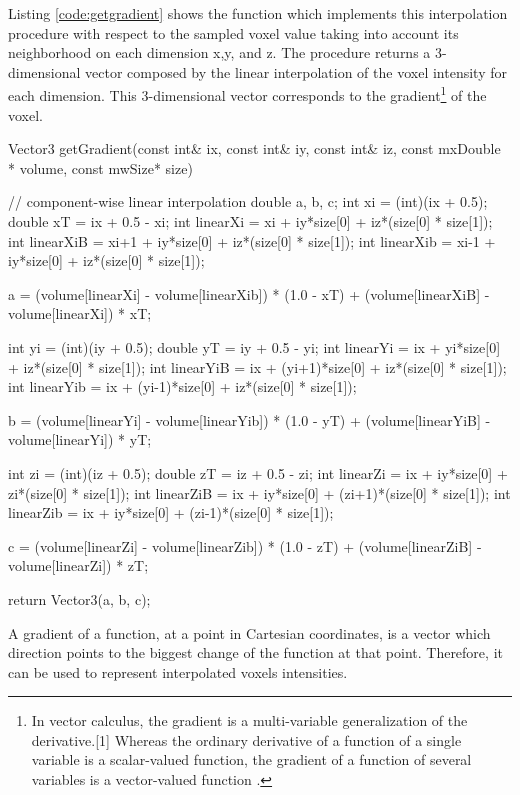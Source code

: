 \documentclass[12pt,a4paper]{extarticle}
\newcommand{\linespace}{\vspace{0pt}}
\begin{document}
Listing \ref{code:getgradient} shows the function which implements this interpolation procedure with respect to the sampled voxel value taking into account its neighborhood on each dimension x,y, and z. The procedure returns a 3-dimensional vector composed by the linear interpolation of the voxel intensity for each dimension. This 3-dimensional vector corresponds to the gradient\footnote{In vector calculus, the gradient is a multi-variable generalization of the derivative.[1] Whereas the ordinary derivative of a function of a single variable is a scalar-valued function, the gradient of a function of several variables is a vector-valued function \cite{gradient:7}.} of the voxel. 

\begin{cpp}[caption={Component-wise linear interpolation functions computing voxel gradient},label=code:getgradient]
Vector3 getGradient(const int& ix, const int& iy, const int& iz, 
		const mxDouble * volume, const mwSize* size) {
	// component-wise linear interpolation
	double a, b, c;
	int xi = (int)(ix + 0.5);
	double xT = ix + 0.5 - xi;
	int linearXi = xi + iy*size[0] + iz*(size[0] * size[1]);
	int linearXiB = xi+1 + iy*size[0] + iz*(size[0] * size[1]);
	int linearXib = xi-1 + iy*size[0] + iz*(size[0] * size[1]);

	a = (volume[linearXi] - volume[linearXib]) * (1.0 - xT) + 
	(volume[linearXiB] - volume[linearXi]) * xT;
	
	int yi = (int)(iy + 0.5);
	double yT = iy + 0.5 - yi;
	int linearYi = ix + yi*size[0] + iz*(size[0] * size[1]);
	int linearYiB = ix + (yi+1)*size[0] + iz*(size[0] * size[1]);
	int linearYib = ix + (yi-1)*size[0] + iz*(size[0] * size[1]);
	
	b = (volume[linearYi] - volume[linearYib]) * (1.0 - yT) + 
	(volume[linearYiB] - volume[linearYi]) * yT;
	
	int zi = (int)(iz + 0.5);
	double zT = iz + 0.5 - zi;
	int linearZi = ix + iy*size[0] + zi*(size[0] * size[1]);
	int linearZiB = ix + iy*size[0] + (zi+1)*(size[0] * size[1]);
	int linearZib = ix + iy*size[0] + (zi-1)*(size[0] * size[1]);
	
	c = (volume[linearZi] - volume[linearZib]) * (1.0 - zT) + 
	(volume[linearZiB] - volume[linearZi]) * zT;
	
	return Vector3(a, b, c);
}
\end{cpp}

A gradient of a function, at a point in Cartesian coordinates, is a vector which direction points to the biggest change of the function at that point. Therefore, it can be used to represent interpolated voxels intensities.
\linespace
\end{document}
